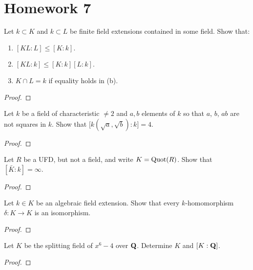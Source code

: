 \chapter{Homework 7}
\begin{problem}
Let $k\subset K$ and $k\subset L$ be finite field extensions contained in
some field. Show that:
\begin{enumerate}[label=(\alph*)]
\item $[KL:L]\leq [K:k]$.
\item $[KL:k]\leq [K:k][L:k]$.
\item $K\cap L=k$ if equality holds in (b).
\end{enumerate}
\end{problem}
\begin{proof}
\end{proof}

\begin{problem}
Let $k$ be a field of characteristic $\neq 2$ and $a,b$ elements of $k$ so
that $a$, $b$, $ab$ are not squares in $k$. Show that
$\bigl[k{(\sqrt{a},\sqrt{b})}:k\bigr]=4$.
\end{problem}
\begin{proof}
\end{proof}

\begin{problem}
Let $R$ be a UFD, but not a field, and write $K=\operatorname{Quot}(R)$. Show that $[\bar
K:k]=\infty$.
\end{problem}
\begin{proof}
\end{proof}

\begin{problem}
Let $k\in K$ be an algebraic field extension. Show that every
$k$-homomorphism $\delta\colon K\to K$ is an isomorphism.
\end{problem}
\begin{proof}
\end{proof}

\begin{problem}
Let $K$ be the splitting field of $x^6-4$ over $\mathbf{Q}$. Determine $K$ and
$[K:\mathbf{Q}]$.
\end{problem}
\begin{proof}
\end{proof}

